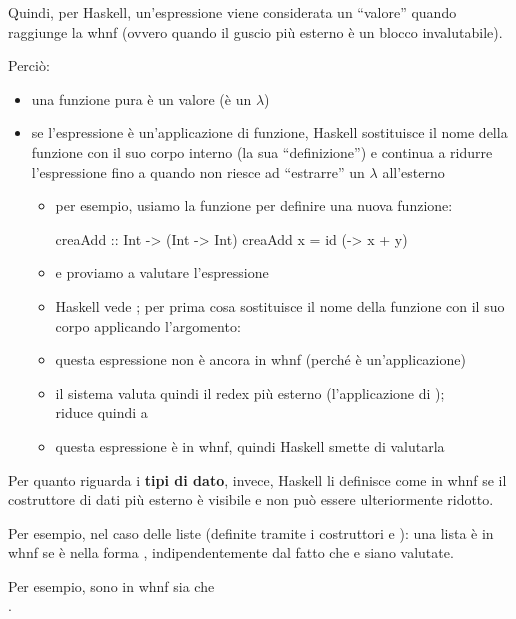 Quindi, per Haskell, un'espressione viene considerata un ``valore'' quando raggiunge la whnf (ovvero quando il guscio più esterno è un blocco invalutabile).

Perciò:
\begin{itemize}
    \item una funzione pura è un valore (è un $\lambda$)
    \item se l'espressione è un'applicazione di funzione, Haskell sostituisce il nome della funzione con il suo corpo interno (la sua ``definizione'') e continua a ridurre l'espressione fino a quando non riesce ad ``estrarre'' un $\lambda$ all'esterno
        \begin{itemize}
            \item per esempio, usiamo la funzione  per definire una nuova funzione:
                \begin{haskellbox}{}
creaAdd :: Int -> (Int -> Int)
creaAdd x = id (\y -> x + y)
                \end{haskellbox}
            \item e proviamo a valutare l'espressione 
            \item Haskell vede ; per prima cosa sostituisce il nome della funzione con il suo corpo applicando l'argomento: 
            \item questa espressione non è ancora in whnf (perché è un'applicazione)
            \item il sistema valuta quindi il redex più esterno (l'applicazione di );\\
                riduce quindi a 
            \item questa espressione è in whnf, quindi Haskell smette di valutarla
        \end{itemize}
\end{itemize}

Per quanto riguarda i \textbf{tipi di dato}, invece, Haskell li definisce come in whnf se il costruttore di dati più esterno è visibile e non può essere ulteriormente ridotto.

Per esempio, nel caso delle liste (definite tramite i costruttori \code{:} e \code{[]}): una lista è in whnf se è nella forma , indipendentemente dal fatto che  e  siano valutate.

Per esempio, sono in whnf sia  che \\ .

